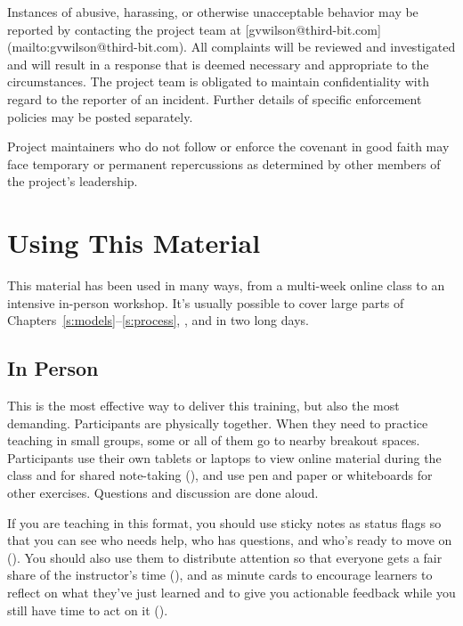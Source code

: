 Instances of abusive, harassing, or otherwise unacceptable behavior
may be reported by contacting the project team at
[gvwilson@third-bit.com](mailto:gvwilson@third-bit.com).  All
complaints will be reviewed and investigated and will result in a
response that is deemed necessary and appropriate to the
circumstances. The project team is obligated to maintain
confidentiality with regard to the reporter of an incident.  Further
details of specific enforcement policies may be posted separately.

Project maintainers who do not follow or enforce the covenant in good
faith may face temporary or permanent repercussions as determined by
other members of the project's leadership.

\section{Using This Material}\label{s:joining-using}

This material has been used in many ways, from a multi-week online
class to an intensive in-person workshop.  It's usually possible to
cover large parts of Chapters~\ref{s:models}--\ref{s:process},
, and  in two long days.

\subsection*{In Person}

This is the most effective way to deliver this training, but also the
most demanding.  Participants are physically together. When they need
to practice teaching in small groups, some or all of them go to nearby
breakout spaces.  Participants use their own tablets or laptops to
view online material during the class and for shared note-taking
(), and use pen and paper or
whiteboards for other exercises.  Questions and discussion are done
aloud.

If you are teaching in this format, you should use sticky notes as
status flags so that you can see who needs help, who has questions,
and who's ready to move on ().  You
should also use them to distribute attention so that everyone gets a
fair share of the instructor's time (),
and as minute cards to encourage learners to reflect on what they've
just learned and to give you actionable feedback while you still have
time to act on it ().

